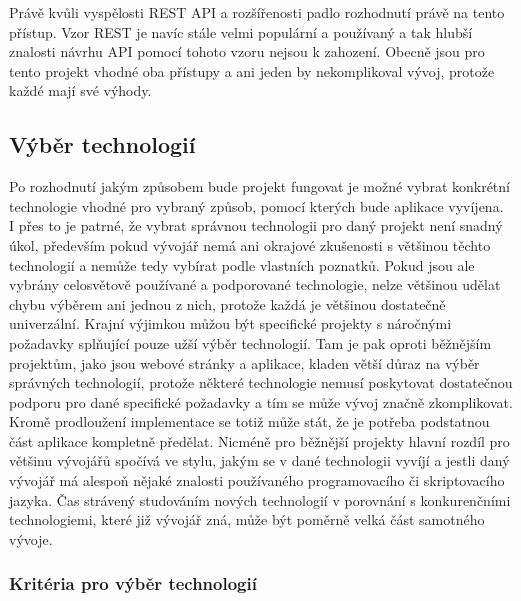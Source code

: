 \begin{itemize}
\begin{itemize}
	Právě kvůli vyspělosti \ac{REST} \ac{API} a rozšířenosti padlo rozhodnutí právě na tento přístup.
	Vzor \ac{REST} je navíc stále velmi populární a používaný a tak hlubší znalosti návrhu \ac{API} pomocí tohoto vzoru
	nejsou k zahození.
	Obecně jsou pro tento projekt vhodné oba přístupy a ani jeden by nekomplikoval vývoj, protože každé mají své výhody.

	\subsection{Výběr technologií}

	Po rozhodnutí jakým způsobem bude projekt fungovat je možné vybrat konkrétní technologie vhodné pro vybraný způsob,
	pomocí kterých bude aplikace vyvíjena.
	I přes to je patrné, že vybrat správnou technologii pro daný projekt není snadný úkol, především pokud vývojář
	nemá ani okrajové zkušenosti s většinou těchto technologií a nemůže tedy vybírat podle vlastních poznatků.
	Pokud jsou ale vybrány celosvětově používané a podporované technologie, nelze většinou udělat chybu výběrem ani
	jednou z nich, protože každá je většinou dostatečně univerzální.
	Krajní výjimkou můžou být specifické projekty s náročnými požadavky splňující pouze užší výběr technologií.
	Tam je pak oproti běžnějším projektům, jako jsou webové stránky a aplikace, kladen větší důraz na výběr správných
	technologií, protože některé technologie nemusí poskytovat dostatečnou podporu pro dané specifické požadavky a tím
	se může vývoj značně zkomplikovat.
	Kromě prodloužení implementace se totiž může stát, že je potřeba podstatnou část aplikace kompletně předělat.
	Nicméně pro běžnější projekty hlavní rozdíl pro většinu vývojářů spočívá ve stylu, jakým se v dané technologii
	vyvíjí a jestli daný vývojář má alespoň nějaké znalosti používaného programovacího či skriptovacího jazyka.
	Čas strávený studováním nových technologií v porovnání s konkurenčními technologiemi, které již vývojář zná, může být
	poměrně velká část samotného vývoje.

		\subsubsection{Kritéria pro výběr technologií}


\end{itemize}
\end{itemize}
